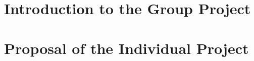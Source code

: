 \documentclass[12pt,a4paper]{article}
\begin{document}
\setcounter{page}{1}


\setcounter{page}{1}
\setcounter{table}{1}

\renewcommand{\contentsname}{\fontsize{18pt}{\baselineskip}\selectfont \textbf{Content}}
\tableofcontents
\newpage

\setcounter{page}{1}
\part{Introduction to the Group Project}
\setcounter{section}{1}






\newpage

\part{Proposal of the Individual Project}
\setcounter{section}{2}
\setcounter{subsection}{0}







\newpage

\end{document}
